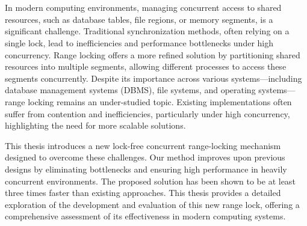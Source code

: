 \chapter{\abstractname}

In modern computing environments, managing concurrent access to shared resources, such as database tables, file regions, or memory segments, is a significant challenge. 
Traditional synchronization methods, often relying on a single lock, lead to inefficiencies and performance bottlenecks under high concurrency. 
Range locking offers a more refined solution by partitioning shared resources into multiple segments, allowing different processes to access these segments concurrently. 
Despite its importance across various systems—including database management systems (DBMS), file systems, and operating systems—range locking remains an under-studied topic. 
Existing implementations often suffer from contention and inefficiencies, particularly under high concurrency, highlighting the need for more scalable solutions.

This thesis introduces a new lock-free concurrent range-locking mechanism designed to overcome these challenges. 
Our method improves upon previous designs by eliminating bottlenecks and ensuring high performance in heavily concurrent environments. 
The proposed solution has been shown to be at least three times faster than existing approaches. 
This thesis provides a detailed exploration of the development and evaluation of this new range lock, offering a comprehensive assessment of its effectiveness in modern computing systems.
